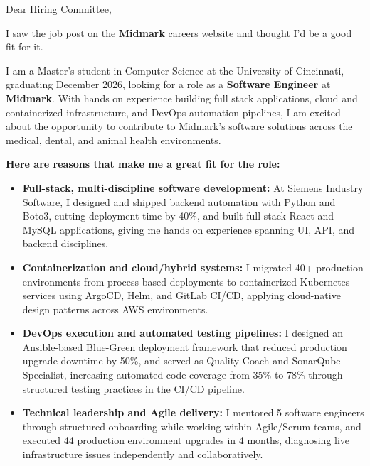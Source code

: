\documentclass[11pt]{letter}
\date{}
\begin{document}
\begin{letter}{}

\opening{Dear Hiring Committee,}

I saw the job post on the \textbf{Midmark} careers website and thought I'd be a good fit for it.

I am a Master's student in Computer Science at the University of Cincinnati, graduating December 2026, looking for a role as a \textbf{Software Engineer} at \textbf{Midmark}. With hands on experience building full stack applications, cloud and containerized infrastructure, and DevOps automation pipelines, I am excited about the opportunity to contribute to Midmark's software solutions across the medical, dental, and animal health environments.

\textbf{Here are reasons that make me a great fit for the role:}

\begin{itemize}[leftmargin=*, itemsep=0.45em]
    \item \textbf{Full-stack, multi-discipline software development:} At Siemens Industry Software, I designed and shipped backend automation with Python and Boto3, cutting deployment time by 40\%, and built full stack React and MySQL applications, giving me hands on experience spanning UI, API, and backend disciplines.

    \item \textbf{Containerization and cloud/hybrid systems:} I migrated 40+ production environments from process-based deployments to containerized Kubernetes services using ArgoCD, Helm, and GitLab CI/CD, applying cloud-native design patterns across AWS environments.

    \item \textbf{DevOps execution and automated testing pipelines:} I designed an Ansible-based Blue-Green deployment framework that reduced production upgrade downtime by 50\%, and served as Quality Coach and SonarQube Specialist, increasing automated code coverage from 35\% to 78\% through structured testing practices in the CI/CD pipeline.

    \item \textbf{Technical leadership and Agile delivery:} I mentored 5 software engineers through structured onboarding while working within Agile/Scrum teams, and executed 44 production environment upgrades in 4 months, diagnosing live infrastructure issues independently and collaboratively.
\end{itemize}


\end{letter}
\end{document}
